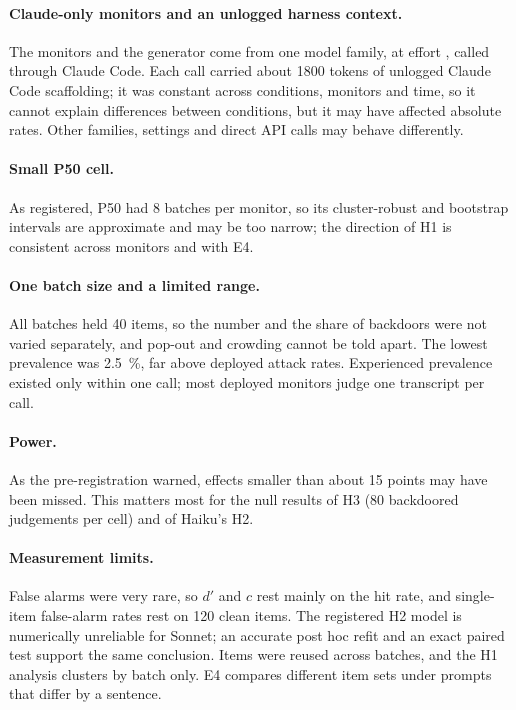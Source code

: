 \documentclass[11pt]{article}
\begin{document}
\paragraph{Claude-only monitors and an unlogged harness context.} The monitors and the generator come from one model family, at effort , called through Claude Code. Each call carried about \num{1800} tokens of unlogged Claude Code scaffolding; it was constant across conditions, monitors and time, so it cannot explain differences between conditions, but it may have affected absolute rates. Other families, settings and direct API calls may behave differently.

\paragraph{Small P50 cell.} As registered, P50 had 8 batches per monitor, so its cluster-robust and bootstrap intervals are approximate and may be too narrow; the direction of H1 is consistent across monitors and with E4.

\paragraph{One batch size and a limited range.} All batches held 40 items, so the number and the share of backdoors were not varied separately, and pop-out and crowding cannot be told apart. The lowest prevalence was \SI{2.5}{\percent}, far above deployed attack rates. Experienced prevalence existed only within one call; most deployed monitors judge one transcript per call.

\paragraph{Power.} As the pre-registration warned, effects smaller than about 15 points may have been missed. This matters most for the null results of H3 (80 backdoored judgements per cell) and of Haiku's H2.

\paragraph{Measurement limits.} False alarms were very rare, so $d'$ and $c$ rest mainly on the hit rate, and single-item false-alarm rates rest on 120 clean items. The registered H2 model is numerically unreliable for Sonnet; an accurate post hoc refit and an exact paired test support the same conclusion. Items were reused across batches, and the H1 analysis clusters by batch only. E4 compares different item sets under prompts that differ by a sentence.
\end{document}
